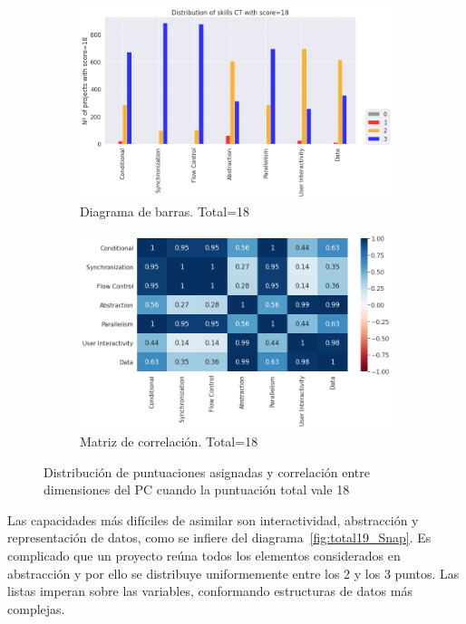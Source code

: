 \documentclass[a4paper, 12pt]{book}
\begin{document}
\begin{figure}[H]
    \centering
    \begin{subfigure}[h]{.49\textwidth} 
        \includegraphics[width=\textwidth]{img/distribucion_18_Snap}
        \caption{Diagrama de barras. Total=18}
        \label{fig:total18_Snap}
    \end{subfigure}       
    \begin{subfigure}[h]{.49\textwidth} 
        \includegraphics[width=\textwidth]{img/corr_18_Snap}
        \caption{Matriz de correlación. Total=18}
        \label{fig:corr18_Snap}
    \end{subfigure}
    \caption{Distribución de puntuaciones asignadas y correlación entre dimensiones del PC cuando la puntuación total vale 18}
\end{figure}

Las capacidades más difíciles de asimilar son interactividad, abstracción y representación de datos, como se infiere del diagrama~\ref{fig:total19_Snap}. Es complicado que un proyecto reúna todos los elementos considerados en abstracción y por ello se distribuye uniformemente entre los 2 y los 3 puntos. Las listas imperan sobre las variables, conformando estructuras de datos más complejas. 
\end{document}
